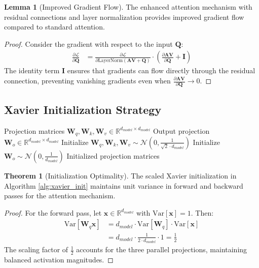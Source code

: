 \documentclass[12pt]{article}
\theoremstyle{definition}
\newtheorem{lemma}{Lemma}
\newtheorem{theorem}{Theorem}
\begin{document}
\begin{lemma}[Improved Gradient Flow]
The enhanced attention mechanism with residual connections and layer normalization provides improved gradient flow compared to standard attention.
\end{lemma}

\begin{proof}
Consider the gradient with respect to the input $\mathbf{Q}$:
\begin{align}
\frac{\partial \mathcal{L}}{\partial \mathbf{Q}} &= \frac{\partial \mathcal{L}}{\partial \text{LayerNorm}(\mathbf{A}\mathbf{V} + \mathbf{Q})} \cdot \left(\frac{\partial \mathbf{A}\mathbf{V}}{\partial \mathbf{Q}} + \mathbf{I}\right)
\end{align}
The identity term $\mathbf{I}$ ensures that gradients can flow directly through the residual connection, preventing vanishing gradients even when $\frac{\partial \mathbf{A}\mathbf{V}}{\partial \mathbf{Q}} \rightarrow 0$.
\end{proof}

\subsection{Xavier Initialization Strategy}

\begin{algorithm}[H]
\caption{Enhanced Xavier Initialization for Attention Projections}
\label{alg:xavier_init}
\begin{algorithmic}[1]
\REQUIRE Projection matrices $\mathbf{W}_q, \mathbf{W}_k, \mathbf{W}_v \in \mathbb{R}^{d_{model} \times d_{model}}$
\REQUIRE Output projection $\mathbf{W}_o \in \mathbb{R}^{d_{model} \times d_{model}}$
\STATE Initialize $\mathbf{W}_q, \mathbf{W}_k, \mathbf{W}_v \sim \mathcal{N}(0, \frac{1}{\sqrt{2} \cdot d_{model}})$
\STATE Initialize $\mathbf{W}_o \sim \mathcal{N}(0, \frac{1}{d_{model}})$
\RETURN Initialized projection matrices
\end{algorithmic}
\end{algorithm}

\begin{theorem}[Initialization Optimality]
The scaled Xavier initialization in Algorithm \ref{alg:xavier_init} maintains unit variance in forward and backward passes for the attention mechanism.
\end{theorem}

\begin{proof}
For the forward pass, let $\mathbf{x} \in \mathbb{R}^{d_{model}}$ with $\text{Var}[\mathbf{x}] = 1$. Then:
\begin{align}
\text{Var}[\mathbf{W}_q \mathbf{x}] &= d_{model} \cdot \text{Var}[\mathbf{W}_q] \cdot \text{Var}[\mathbf{x}] \\
&= d_{model} \cdot \frac{1}{2 \cdot d_{model}} \cdot 1 = \frac{1}{2}
\end{align}
The scaling factor of $\frac{1}{2}$ accounts for the three parallel projections, maintaining balanced activation magnitudes.
\end{proof}
\end{document}
